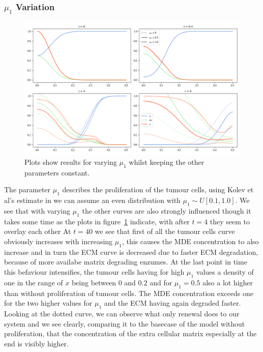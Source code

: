 \subsubsection*{$\mu_1$ Variation}
\begin{figure}[h]
    \centering
    \includegraphics[width=\textwidth]{resources/images/prolif_mu_1_variation.png}
    \caption{Plots show results for varying $\mu_1$ whilst keeping the other parameters constant.}
    \label{fig:prolif_mu_1_variation}
\end{figure}

The parameter $\mu_1$ describes the proliferation of the tumour cells, using Kolev et al's estimate in \cite{Kolev2010} we can assume an even distribution with $\mu_1 \sim U[0.1, 1.0]$. We see that with varying $\mu_1$ the other curves are also strongly influenced though it takes some time as the plots in figure~\ref{fig:prolif_mu_1_variation} indicate, with after $t=4$ they seem to overlay each other At $t=40$ we see that first of all the tumour cells curve obviously increases with increasing $\mu_1$, this causes the MDE concentration to also increase and in turn the ECM curve is decreased due to faster ECM degradation, because of more availabe matrix degrading enzumes. At the last point in time this befaviour intensifies, the tumour cells having for high $\mu_1$ values a density of one in the range of $x$ being between $0$ and $0.2$ and for $\mu_1=0.5$ also a lot higher than without proliferation of tumour cells. The MDE concentration exceeds one for the two higher values for $\mu_1$ and the ECM having again degraded faster. Looking at the dotted curve, we can observe what only renewal does to our system and we see clearly, comparing it to the basecase of the model without proliferation, that the concentration of the extra cellular matrix especially at the end is visibly higher.



